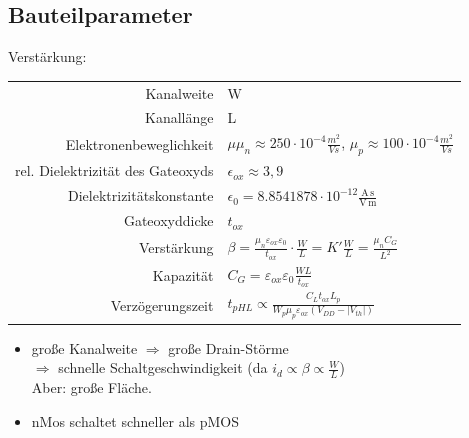 \documentclass[6pt,a4paper]{scrartcl}
\newcommand{\Ra}[0]{\ensuremath{\Rightarrow}}									%
\begin{document}
\begin{multicols}{3}
	\subsection{Bauteilparameter}
	Verstärkung:  \\
	\begin{tabular} {r | l}
		Kanalweite & W  \\
		Kanallänge & L  \\
		Elektronenbeweglichkeit & $\mu$\quad $\mu_n \approx 250 \cdot 10^{-4} \frac{m^2}{Vs}$, $\mu_p \approx 100 \cdot 10^{-4} \frac{m^2}{Vs}$ \\
		rel. Dielektrizität des Gateoxyds & $\epsilon_{ox} \approx 3,9$ \\
		Dielektrizitätskonstante & $\epsilon_0 = 8.8541878 \cdot 10^{-12} \frac{\mathrm{A\,s}}{\mathrm{V\,m}}$ \\
		Gateoxyddicke & $t_{ox}$ \\
		Verstärkung & $\beta = \frac{\mu_n \varepsilon_{ox} \varepsilon_0}{t_{ox}} \cdot \frac{W}{L} = K' \frac{W}{L} = \frac{\mu_n C_G}{L^2}$ \\
		Kapazität & $C_G = \varepsilon_{ox} \varepsilon_0 \frac{WL}{t_{ox}}$ \\
		Verzögerungszeit & $t_{pHL} \propto \frac{C_L t_{ox} L_p}{W_p \mu_p \varepsilon_{ox} (V_{DD} - |V_{th}|)}$ \\
	\end{tabular}
	\begin{itemize}
		\item große Kanalweite $\Ra$ große Drain-Störme \\ $\Ra$ schnelle Schaltgeschwindigkeit (da $i_d \propto \beta \propto \frac{W}{L}$) \\
		Aber: große Fläche.
		\item nMos schaltet schneller als pMOS 
	\end{itemize}
	
	

\end{multicols}
\end{document}
